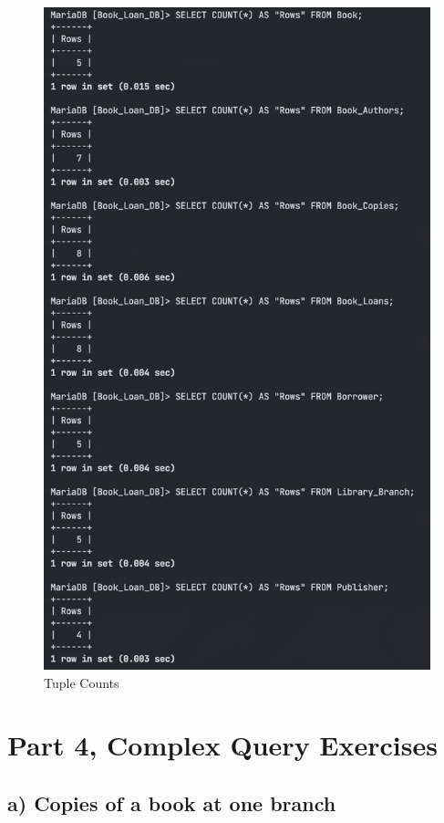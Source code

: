 \documentclass{article}
\begin{document}
\begin{figure}[!h]
    \centering
    \includegraphics[scale=0.425]{images/q3-import-results.png}
    \caption{Tuple Counts}
    \label{fig:q3_tuple_counts}
\end{figure}

\section{Part 4, Complex Query Exercises}

\subsection{a) Copies of a book at one branch}
\end{document}
